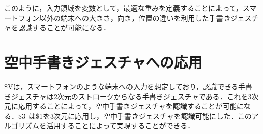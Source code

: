 このように，入力領域を変数として，最適な重みを定義することによって，スマートフォン以外の端末への大きさ，向き，位置の違いを利用した手書きジェスチャを認識することが可能になる．

\section{空中手書きジェスチャへの応用}
\$Vは，スマートフォンのような端末への入力を想定しており，認識できる手書きジェスチャは2次元のストロークからなる手書きジェスチャである．これを3次元に応用することによって，空中手書きジェスチャを認識することが可能になる．\$3~\cite{}は\$1を3次元に応用し，空中手書きジェスチャを認識可能にした．このアルゴリズムを活用することによって実現することができる．


